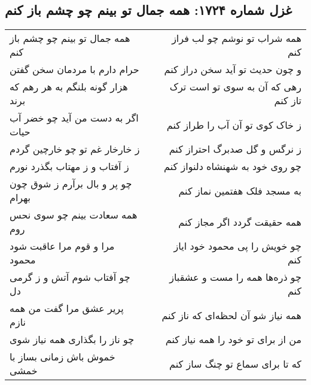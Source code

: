 \begin{center}
\section*{غزل شماره ۱۷۲۴: همه جمال تو بینم چو چشم باز کنم}
\label{sec:1724}
\begin{longtable}{l p{0.5cm} r}
همه جمال تو بینم چو چشم باز کنم
&&
همه شراب تو نوشم چو لب فراز کنم
\\
حرام دارم با مردمان سخن گفتن
&&
و چون حدیث تو آید سخن دراز کنم
\\
هزار گونه بلنگم به هر رهم که برند
&&
رهی که آن به سوی تو است ترک تاز کنم
\\
اگر به دست من آید چو خضر آب حیات
&&
ز خاک کوی تو آن آب را طراز کنم
\\
ز خارخار غم تو چو خارچین گردم
&&
ز نرگس و گل صدبرگ احتراز کنم
\\
ز آفتاب و ز مهتاب بگذرد نورم
&&
چو روی خود به شهنشاه دلنواز کنم
\\
چو پر و بال برآرم ز شوق چون بهرام
&&
به مسجد فلک هفتمین نماز کنم
\\
همه سعادت بینم چو سوی نحس روم
&&
همه حقیقت گردد اگر مجاز کنم
\\
مرا و قوم مرا عاقبت شود محمود
&&
چو خویش را پی محمود خود ایاز کنم
\\
چو آفتاب شوم آتش و ز گرمی دل
&&
چو ذره‌ها همه را مست و عشقباز کنم
\\
پریر عشق مرا گفت من همه نازم
&&
همه نیاز شو آن لحظه‌ای که ناز کنم
\\
چو ناز را بگذاری همه نیاز شوی
&&
من از برای تو خود را همه نیاز کنم
\\
خموش باش زمانی بساز با خمشی
&&
که تا برای سماع تو چنگ ساز کنم
\\
\end{longtable}
\end{center}
